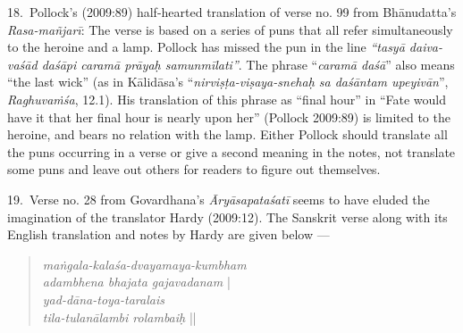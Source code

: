 18.~Pollock’s (2009:89) half-hearted translation of verse no. 99 from Bhānudatta’s \textsl{Rasa-mañjarī}: The verse is based on a series of puns that all refer simultaneously to the heroine and a lamp. Pollock has missed the pun in the line \textsl{“tasyā daiva-vaśād daśāpi caramā prāyaḥ samunmīlati”}. The phrase “\textsl{caramā daśā}” also means “the last wick” (as in Kālidāsa’s “\textsl{nirviṣṭa-viṣaya-snehaḥ sa daśāntam upeyivān}”, \textsl{Raghuvaṁśa}, 12.1). His translation of this phrase as “final hour” in “Fate would have it that her final hour is nearly upon her” (Pollock 2009:89) is limited to the heroine, and bears no relation with the lamp. Either Pollock should translate all the puns occurring in a verse or give a second meaning in the notes, not translate some puns and leave out others for readers to figure out themselves.

19.~Verse no. 28 from Govardhana’s \textsl{Āryāsapataśatī} seems to have eluded the imagination of the translator Hardy (2009:12). The Sanskrit verse along with its English translation and notes by Hardy are given below --- 
\begin{quote}
\textsl{maṅgala-kalaśa-dvayamaya-kumbham}\\
\textsl{adambhena bhajata gajavadanam} |\\
\textsl{yad-dāna-toya-taralais}\\
\textsl{tila-tulanālambi rolambaiḥ} ||
\end{quote}

